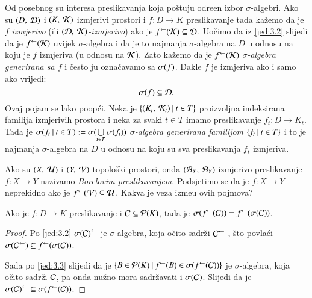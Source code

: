 Od posebnog su interesa preslikavanja koja po\v stuju odre\dj en
izbor $\sigma$-algebri. Ako su $(D, \: \mathcal{D})$ i
$(K, \: \mathcal{K})$ izmjerivi prostori i $f: D \to K$ preslikavanje
tada ka\v zemo da je $f$ \emph{izmjerivo} (ili \emph{$(\mathcal{D},
\: \mathcal{K})$-izmjerivo}) ako je ${f}^{\leftarrow}(\mathcal{K}) \subseteq \mathcal{D}$.
Uo\v cimo da iz \eqref{jed:3.2} slijedi da je ${f}^{\leftarrow}(\mathcal{K})$
uvijek $\sigma$-algebra i da je to najmanja $\sigma$-algebra na $D$
u odnosu na koju je $f$ izmjeriva (u odnosu na $\mathcal{K}$).
Zato ka\v zemo da je ${f}^{\leftarrow}(\mathcal{K})$ \emph{$\sigma$-algebra
generirana sa $f$} i \v cesto ju ozna\v cavamo sa \emph{$\sigma({f})$}.
Dakle $f$ je izmjeriva ako i samo ako vrijedi:
\begin{equation*}
    \sigma({f}) \subseteq \mathcal{D}.
\end{equation*}
Ovaj pojam se lako poop\' ci. Neka je $\{{(K_t, \: \mathcal{K}_t)} \: | \: {t \in T}\}$ proizvoljna indeksirana familija izmjerivih prostora i
neka za svaki $t \in T$ imamo preslikavanje $f_t : D \to K_t$.
Tada je  $\sigma({f_t} \: | \: {t \in T}) := \sigma({\bigcup\limits_{t \in T}^{}
\sigma({f_t})})$ \emph{$\sigma$-algebra generirana familijom
$\{{f_t} \: | \: {t \in T}\}$} i to je najmanja $\sigma$-algebra
na $D$ u odnosu na koju su sva preslikavanja $f_t$ izmjeriva.

Ako su $(X, \: \mathcal{U})$ i $(Y, \: \mathcal{V})$ topolo\v ski prostori, onda
$(\mathcal{B}_{X}, \: \mathcal{B}_{Y})$-izmjerivo preslikavanje $f: X \to Y$
nazivamo \emph{Borelovim preslikavanjem}. Podsjetimo se da je
$f: X \to Y$ neprekidno ako je ${f}^{\leftarrow}(\mathcal{V}) \subseteq \mathcal{U}$.
Kakva je veza izme\dj u ovih pojmova?

\begin{lm}  \label{lm:3.4}
    Ako je $f: D \to K$ preslikavanje i $\mathcal{C} \subseteq
    \mathcal{P}({K})$, tada je $\sigma({{f}^{\leftarrow}(\mathcal{C})})
    = {f}^{\leftarrow} (\sigma({\mathcal{C}}))$.
\end{lm}

\begin{proof}
    Po \eqref{jed:3.2} ${\sigma({\mathcal{C}})}^{\leftarrow}$ je
    $\sigma$-algebra, koja o\v cito sadr\v zi ${\mathcal{C}}^{\leftarrow}$
    , \v sto povla\' ci $\sigma({{\mathcal{C}}^{\leftarrow}}) \subseteq
    {f}^{\leftarrow}(\sigma({\mathcal{C}}))$.

    Sada po \eqref{jed:3.3} slijedi da je $\{{B \in \mathcal{P}({K})} \: | \: {{f}^{\leftarrow}(B) \in \sigma({{f}^{\leftarrow}(\mathcal{C})})}\}$ je
    $\sigma$-algebra, koja o\v cito sadr\v zi $\mathcal{C}$, pa onda
    nu\v zno mora sadr\v zavati i $\sigma({\mathcal{C}})$.
    Slijedi da je ${\sigma({\mathcal{C}})}^{\leftarrow} \subseteq
    \sigma({{f}^{\leftarrow}(\mathcal{C})})$. 
\end{proof}

